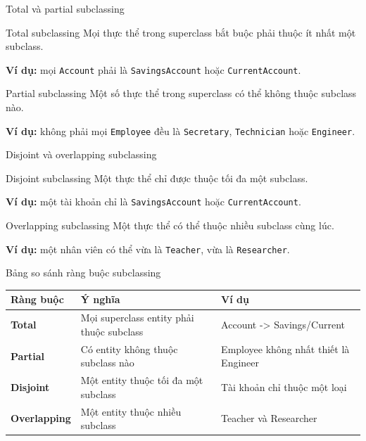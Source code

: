 \documentclass[aspectratio=169,11pt]{beamer}
\newcommand{\codeword}[1]{\texttt{#1}}
\begin{document}
\begin{frame}{Total và partial subclassing}
\begin{block}{Total subclassing}
Mọi thực thể trong superclass bắt buộc phải thuộc ít nhất một subclass.
\end{block}
\textbf{Ví dụ:} mọi \codeword{Account} phải là \codeword{SavingsAccount} hoặc \codeword{CurrentAccount}.

\vspace{0.3cm}
\begin{block}{Partial subclassing}
Một số thực thể trong superclass có thể không thuộc subclass nào.
\end{block}
\textbf{Ví dụ:} không phải mọi \codeword{Employee} đều là \codeword{Secretary}, \codeword{Technician} hoặc \codeword{Engineer}.
\end{frame}

\begin{frame}{Disjoint và overlapping subclassing}
\begin{block}{Disjoint subclassing}
Một thực thể chỉ được thuộc tối đa một subclass.
\end{block}
\textbf{Ví dụ:} một tài khoản chỉ là \codeword{SavingsAccount} hoặc \codeword{CurrentAccount}.

\vspace{0.3cm}
\begin{block}{Overlapping subclassing}
Một thực thể có thể thuộc nhiều subclass cùng lúc.
\end{block}
\textbf{Ví dụ:} một nhân viên có thể vừa là \codeword{Teacher}, vừa là \codeword{Researcher}.
\end{frame}

\begin{frame}{Bảng so sánh ràng buộc subclassing}
\begin{table}
\centering
\scriptsize
\begin{tabularx}{\textwidth}{>{\bfseries}lXX}
\toprule
Ràng buộc & Ý nghĩa & Ví dụ \\
\midrule
Total & Mọi superclass entity phải thuộc subclass & Account -> Savings/Current \\
Partial & Có entity không thuộc subclass nào & Employee không nhất thiết là Engineer \\
Disjoint & Một entity thuộc tối đa một subclass & Tài khoản chỉ thuộc một loại \\
Overlapping & Một entity thuộc nhiều subclass & Teacher và Researcher \\
\bottomrule
\end{tabularx}
\end{table}
\end{frame}
\end{document}
